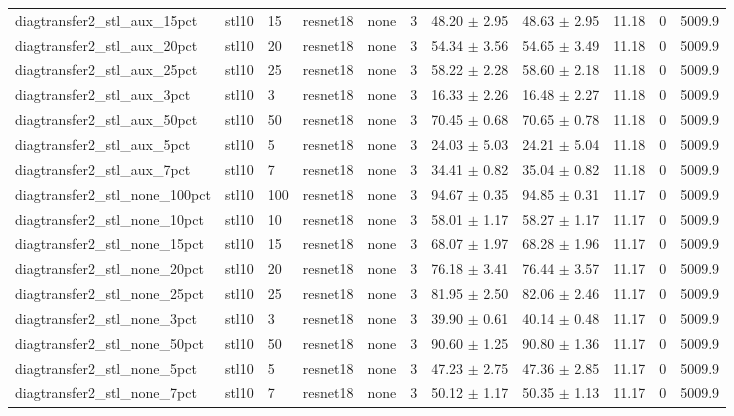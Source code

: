 \begin{tabular}{lllllllllll}
diagtransfer2_stl_aux_15pct & stl10 & 15 & resnet18 & none & 3 & 48.20 $\pm$ 2.95 & 48.63 $\pm$ 2.95 & 11.18 & 0 & 5009.9 \\
diagtransfer2_stl_aux_20pct & stl10 & 20 & resnet18 & none & 3 & 54.34 $\pm$ 3.56 & 54.65 $\pm$ 3.49 & 11.18 & 0 & 5009.9 \\
diagtransfer2_stl_aux_25pct & stl10 & 25 & resnet18 & none & 3 & 58.22 $\pm$ 2.28 & 58.60 $\pm$ 2.18 & 11.18 & 0 & 5009.9 \\
diagtransfer2_stl_aux_3pct & stl10 & 3 & resnet18 & none & 3 & 16.33 $\pm$ 2.26 & 16.48 $\pm$ 2.27 & 11.18 & 0 & 5009.9 \\
diagtransfer2_stl_aux_50pct & stl10 & 50 & resnet18 & none & 3 & 70.45 $\pm$ 0.68 & 70.65 $\pm$ 0.78 & 11.18 & 0 & 5009.9 \\
diagtransfer2_stl_aux_5pct & stl10 & 5 & resnet18 & none & 3 & 24.03 $\pm$ 5.03 & 24.21 $\pm$ 5.04 & 11.18 & 0 & 5009.9 \\
diagtransfer2_stl_aux_7pct & stl10 & 7 & resnet18 & none & 3 & 34.41 $\pm$ 0.82 & 35.04 $\pm$ 0.82 & 11.18 & 0 & 5009.9 \\
diagtransfer2_stl_none_100pct & stl10 & 100 & resnet18 & none & 3 & 94.67 $\pm$ 0.35 & 94.85 $\pm$ 0.31 & 11.17 & 0 & 5009.9 \\
diagtransfer2_stl_none_10pct & stl10 & 10 & resnet18 & none & 3 & 58.01 $\pm$ 1.17 & 58.27 $\pm$ 1.17 & 11.17 & 0 & 5009.9 \\
diagtransfer2_stl_none_15pct & stl10 & 15 & resnet18 & none & 3 & 68.07 $\pm$ 1.97 & 68.28 $\pm$ 1.96 & 11.17 & 0 & 5009.9 \\
diagtransfer2_stl_none_20pct & stl10 & 20 & resnet18 & none & 3 & 76.18 $\pm$ 3.41 & 76.44 $\pm$ 3.57 & 11.17 & 0 & 5009.9 \\
diagtransfer2_stl_none_25pct & stl10 & 25 & resnet18 & none & 3 & 81.95 $\pm$ 2.50 & 82.06 $\pm$ 2.46 & 11.17 & 0 & 5009.9 \\
diagtransfer2_stl_none_3pct & stl10 & 3 & resnet18 & none & 3 & 39.90 $\pm$ 0.61 & 40.14 $\pm$ 0.48 & 11.17 & 0 & 5009.9 \\
diagtransfer2_stl_none_50pct & stl10 & 50 & resnet18 & none & 3 & 90.60 $\pm$ 1.25 & 90.80 $\pm$ 1.36 & 11.17 & 0 & 5009.9 \\
diagtransfer2_stl_none_5pct & stl10 & 5 & resnet18 & none & 3 & 47.23 $\pm$ 2.75 & 47.36 $\pm$ 2.85 & 11.17 & 0 & 5009.9 \\
diagtransfer2_stl_none_7pct & stl10 & 7 & resnet18 & none & 3 & 50.12 $\pm$ 1.17 & 50.35 $\pm$ 1.13 & 11.17 & 0 & 5009.9 \\

\end{tabular}
